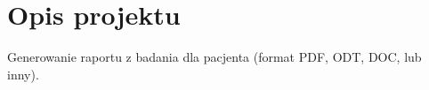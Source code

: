 \section{Opis projektu}
Generowanie raportu z badania dla pacjenta (format PDF, ODT, DOC, lub inny).
